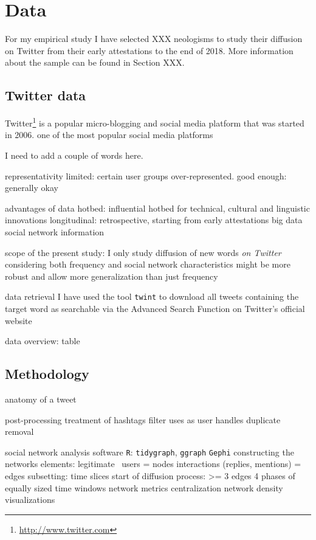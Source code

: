 \documentclass[a4paper, abstract=on]{scrartcl}
\newcommand{\sw}[1]{\texttt{#1}}
\begin{document}
\section{Data}

    For my empirical study I have selected XXX neologisms to study their diffusion on Twitter from their early attestations to the end of 2018. More information about the sample can be found in Section XXX.

  \subsection{Twitter data}

    Twitter\footnote{\url{http://www.twitter.com}} is a popular micro-blogging and social media platform that was started in 2006.
      one of the most popular social media platforms
      
    I need to add a couple of words here.

    representativity
      limited: certain user groups over-represented.
      good enough: generally okay \parencite{Grieve2019a}

    advantages of data
      hotbed: influential hotbed for technical, cultural and linguistic innovations
      longitudinal: retrospective, starting from early attestations
      big data
      social network information

    scope of the present study:
      I only study diffusion of new words \emph{on Twitter}
        considering both frequency and social network characteristics might be more robust and allow more generalization than just frequency

    data retrieval
      I have used the tool \sw{twint}
      to download all tweets containing the target word
      as searchable via the Advanced Search Function on Twitter's official website

    data overview: table

  \subsection{Methodology}

    anatomy of a tweet

    post-processing
      treatment of hashtags
      filter uses as user handles
      duplicate removal

    social network analysis
      software
        \sw{R}: \sw{tidygraph}, \sw{ggraph}
        \sw{Gephi}
      constructing the networks
        elements: legitimate~\parencite{Goel2016}
          users = nodes
          interactions (replies, mentions) = edges
        subsetting: time slices
            start of diffusion process: >= 3 edges
            4 phases of equally sized time windows
        network metrics
          centralization
          network density
        visualizations
\end{document}

